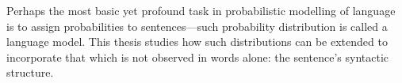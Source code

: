 %

Perhaps the most basic yet profound task in probabilistic modelling of language is to assign probabilities to sentences---such probability distribution is called a language model. This thesis studies how such distributions can be extended to incorporate that which is not observed in words alone: the sentence's syntactic structure.

